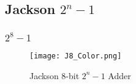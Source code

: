 \subsection{Jackson $2^n-1$}


\subsubsection{$2^8-1$}

%
\begin{figure}[ht]
\centering
\texttt{[image: J8\_Color.png]}
\caption{Jackson 8-bit $2^n-1$ Adder}
\label{Jackson_8-bit_Tree}
\end{figure}






